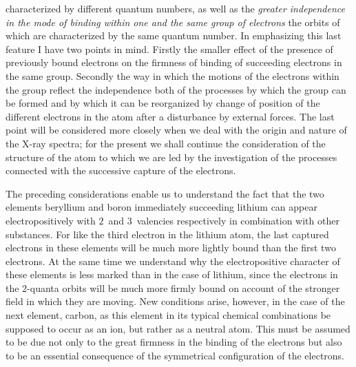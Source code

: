 characterized by different quantum numbers, as well as the \emph{greater
independence in the mode of binding within one and the same group
of electrons} the orbits of which are characterized by the same
quantum number. In emphasizing this last feature I have two
points in mind. Firstly the smaller effect of the presence of previously
bound electrons on the firmness of binding of succeeding
electrons in the same group. Secondly the way in which the motions
of the electrons within the group reflect the independence both of
the processes by which the group can be formed and by which it
can be reorganized by change of position of the different electrons
in the atom after a disturbance by external forces. The last point
will be considered more closely when we deal with the origin and
nature of the X-ray spectra; for the present we shall continue the
consideration of the structure of the atom to which we are led by
the investigation of the processes connected with the successive
capture of the electrons.

The preceding considerations enable us to understand the fact
that the two elements beryllium and boron immediately succeeding
lithium can appear electropositively with $2$~and $3$~valencies respectively
in combination with other substances. For like the third
electron in the lithium atom, the last captured electrons in these
elements will be much more lightly bound than the first two
electrons. At the same time we understand why the electropositive
character of these elements is less marked than in the case of
lithium, since the electrons in the $2$-quanta orbits will be much
more firmly bound on account of the stronger field in which they
are moving. New conditions arise, however, in the case of the
next element, carbon, as this element in its typical chemical combinations
 be supposed to occur as an ion, but rather as a
neutral atom. This must be assumed to be due not only to the great
firmness in the binding of the electrons but also to be an essential
consequence of the symmetrical configuration of the electrons.

